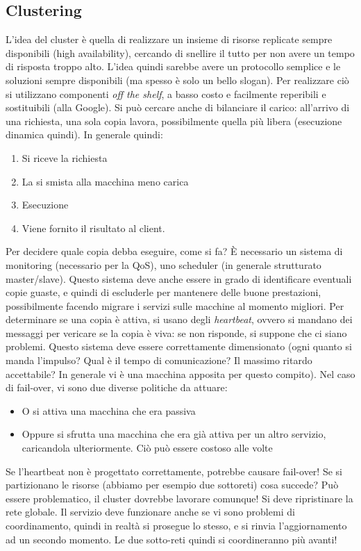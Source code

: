 \subsection{Clustering}
L'idea del cluster è quella di realizzare un insieme di risorse replicate sempre disponibili (high availability),
cercando di snellire il tutto per non avere un tempo di risposta troppo alto. L'idea quindi sarebbe avere un protocollo
semplice e le soluzioni sempre disponibili (ma spesso è solo un bello slogan).
Per realizzare ciò si utilizzano componenti \textit{off the shelf}, a basso costo e facilmente reperibili e 
sostituibili (alla Google). Si può cercare anche di bilanciare il carico: all'arrivo di una richiesta, una sola copia
lavora, possibilmente quella più libera (esecuzione dinamica quindi). In generale quindi:
\begin{enumerate}
 \item Si riceve la richiesta
 \item La si smista alla macchina meno carica
 \item Esecuzione
 \item Viene fornito il risultato al client.
\end{enumerate}
Per decidere quale copia debba eseguire, come si fa? È necessario un sistema di monitoring (necessario per la QoS), 
uno scheduler (in generale strutturato master/slave). Questo sistema deve anche essere in grado di identificare
eventuali copie guaste, e quindi di escluderle per mantenere delle buone prestazioni, possibilmente facendo migrare i
servizi sulle macchine al momento migliori. Per determinare se una copia è attiva, si usano degli \textit{heartbeat},
ovvero si mandano dei messaggi per vericare se la copia è viva: se non risponde, si suppone che ci siano problemi.
Questo sistema deve essere correttamente dimensionato (ogni quanto si manda l'impulso? Qual è il tempo di 
comunicazione? Il massimo ritardo accettabile? In generale vi è una macchina apposita per questo compito).
Nel caso di fail-over, vi sono due diverse politiche da attuare:
\begin{itemize}
 \item O si attiva una macchina che era passiva
 \item Oppure si sfrutta una macchina che era già attiva per un altro servizio, caricandola ulteriormente. Ciò può
 essere costoso alle volte
\end{itemize}
Se l'heartbeat non è progettato correttamente, potrebbe causare fail-over!
Se si partizionano le risorse (abbiamo per esempio due sottoreti) cosa succede? Può essere problematico, il cluster
dovrebbe lavorare comunque! Si deve ripristinare la rete globale. Il servizio deve funzionare anche se vi sono problemi
di coordinamento, quindi in realtà si prosegue lo stesso, e si rinvia l'aggiornamento ad un secondo momento. Le due
sotto-reti quindi si coordineranno più avanti!
